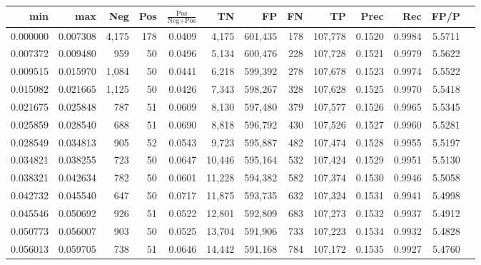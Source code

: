 \begin{tabular}{rrrrrrrrrrrrr}
\toprule
     min &      max &   Neg & Pos & $\frac{\text{Pos}}{\text{Neg}+\text{Pos}}$ &      TN &      FP &      FN &      TP &   Prec &    Rec &   FP/P \\
\midrule
0.000000 & 0.007308 & 4,175 & 178 &                                     0.0409 &   4,175 & 601,435 &     178 & 107,778 & 0.1520 & 0.9984 & 5.5711 \\
0.007372 & 0.009480 &   959 &  50 &                                     0.0496 &   5,134 & 600,476 &     228 & 107,728 & 0.1521 & 0.9979 & 5.5622 \\
0.009515 & 0.015970 & 1,084 &  50 &                                     0.0441 &   6,218 & 599,392 &     278 & 107,678 & 0.1523 & 0.9974 & 5.5522 \\
0.015982 & 0.021665 & 1,125 &  50 &                                     0.0426 &   7,343 & 598,267 &     328 & 107,628 & 0.1525 & 0.9970 & 5.5418 \\
0.021675 & 0.025848 &   787 &  51 &                                     0.0609 &   8,130 & 597,480 &     379 & 107,577 & 0.1526 & 0.9965 & 5.5345 \\
0.025859 & 0.028540 &   688 &  51 &                                     0.0690 &   8,818 & 596,792 &     430 & 107,526 & 0.1527 & 0.9960 & 5.5281 \\
0.028549 & 0.034813 &   905 &  52 &                                     0.0543 &   9,723 & 595,887 &     482 & 107,474 & 0.1528 & 0.9955 & 5.5197 \\
0.034821 & 0.038255 &   723 &  50 &                                     0.0647 &  10,446 & 595,164 &     532 & 107,424 & 0.1529 & 0.9951 & 5.5130 \\
0.038321 & 0.042634 &   782 &  50 &                                     0.0601 &  11,228 & 594,382 &     582 & 107,374 & 0.1530 & 0.9946 & 5.5058 \\
0.042732 & 0.045540 &   647 &  50 &                                     0.0717 &  11,875 & 593,735 &     632 & 107,324 & 0.1531 & 0.9941 & 5.4998 \\
0.045546 & 0.050692 &   926 &  51 &                                     0.0522 &  12,801 & 592,809 &     683 & 107,273 & 0.1532 & 0.9937 & 5.4912 \\
0.050773 & 0.056007 &   903 &  50 &                                     0.0525 &  13,704 & 591,906 &     733 & 107,223 & 0.1534 & 0.9932 & 5.4828 \\
0.056013 & 0.059705 &   738 &  51 &                                     0.0646 &  14,442 & 591,168 &     784 & 107,172 & 0.1535 & 0.9927 & 5.4760 \\

\end{tabular}
